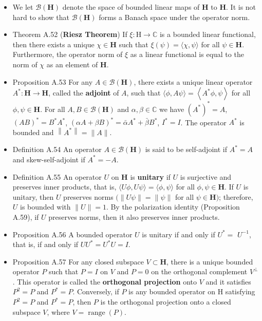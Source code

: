 \begin{itemize}
\item We let $\mathcal{B}(\mathbf{H})$ denote the space of bounded linear maps of $\mathbf{H}$ to $\mathbf{H}$. It is not hard to show that $\mathcal{B}(\mathbf{H})$ forms a Banach space under the operator norm.

\item Theorem A.52 (\textbf{Riesz Theorem}) If $\xi: \mathrm{H} \rightarrow \mathbb{C}$ is a bounded linear functional, then there exists a unique $\chi \in \mathbf{H}$ such that $\xi(\psi)=\langle\chi, \psi\rangle$ for all $\psi \in \mathbf{H}$. Furthermore, the operator norm of $\xi$ as a linear functional is equal to the norm of $\chi$ as an element of $\mathbf{H}$.

\item Proposition A.53 For any $A \in \mathcal{B}(\mathbf{H})$, there exists a unique linear operator $A^{*}: \mathbf{H} \rightarrow \mathbf{H}$, called the \textbf{adjoint} of $A$, such that $\langle\phi, A \psi\rangle=\left\langle A^{*} \phi, \psi\right\rangle$ for all $\phi, \psi \in \mathbf{H}$. For all $A, B \in \mathcal{B}(\mathbf{H})$ and $\alpha, \beta \in \mathbb{C}$ we have $\left(A^{*}\right)^{*} =A$, $(A B)^{*} =B^{*} A^{*}$, $(\alpha A+\beta B)^{*} =\bar{\alpha} A^{*}+\bar{\beta} B^{*}$, $I^{*} =I$. The operator $A^{*}$ is bounded and $\left\|A^{*}\right\|=\|A\|$.

\item Definition A.54 An operator $A \in \mathcal{B}(\mathbf{H})$ is said to be self-adjoint if $A^{*}=A$ and skew-self-adjoint if $A^{*}=-A$.

\item Definition A.55 An operator $U$ on $\mathbf{H}$ is \textbf{unitary} if $U$ is surjective and preserves inner products, that is, $\langle U \phi, U \psi\rangle=\langle\phi, \psi\rangle$ for all $\phi, \psi \in \mathbf{H}$.
If $U$ is unitary, then $U$ preserves norms $(\|U \psi\|=\|\psi\|$ for all $\psi \in \mathbf{H})$; therefore, $U$ is bounded with $\|U\|=1$. By the polarization identity (Proposition A.59), if $U$ preserves norms, then it also preserves inner products.

\item Proposition A.56 A bounded operator $U$ is unitary if and only if $U^{*}=$ $U^{-1}$, that is, if and only if $U U^{*}=U^{*} U=I$.

\item Proposition A.57 For any closed subspace $V \subset \mathbf{H}$, there is a unique bounded operator $P$ such that $P=I$ on $V$ and $P=0$ on the orthogonal complement $V^{\perp}$. This operator is called the \textbf{orthogonal projection} onto $V$ and it satisfies $P^{2}=P$ and $P^{*}=P$. Conversely, if $P$ is any bounded operator on $\mathrm{H}$ satisfying $P^{2}=P$ and $P^{*}=P$, then $P$ is the orthogonal projection onto a closed subspace $V$, where $V=\operatorname{range}(P)$.
\end{itemize}

